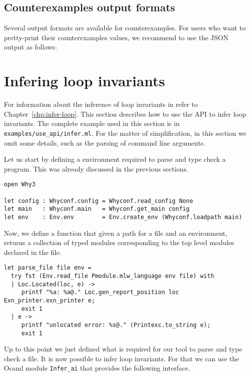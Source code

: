 \subsection{Counterexamples output formats}

Several output formats are available for counterexamples. For users who want to
pretty-print their counterexamples values, we recommend to use the JSON output
as follows:



\section{Infering loop invariants}
\label{sec:infer-loop-api}

For information about the inference of loop invariants in \why refer
to Chapter~\ref{chp:infer-loop}. This section describes how to use the
API to infer loop invariants. The complete example used in this
section is in \verb|examples/use_api/infer.ml|. For the matter of
simplification, in this section we omit some details, such as the
parsing of command line arguments.

Let us start by defining a \why environment required to parse and type
check a \whyml program. This was already discussed in the previous
sections.

\begin{verbatim}
open Why3

let config : Whyconf.config = Whyconf.read_config None
let main   : Whyconf.main   = Whyconf.get_main config
let env    : Env.env        = Env.create_env (Whyconf.loadpath main)
\end{verbatim}

Now, we define a function that given a path for a file and an \why
environment, returns a collection of typed modules corresponding to
the top level modules declared in the file.

\begin{verbatim}
let parse_file file env =
  try fst (Env.read_file Pmodule.mlw_language env file) with
  | Loc.Located(loc, e) ->
     printf "%a: %a@." Loc.gen_report_position loc Exn_printer.exn_printer e;
     exit 1
  | e ->
     printf "unlocated error: %s@." (Printexc.to_string e);
     exit 1
\end{verbatim}

Up to this point we just defined what is required for our tool to
parse and type check a \whyml file. It is now possible to infer loop
invariants. For that we can use the Ocaml module \verb|Infer_ai| that
provides the following interface.

